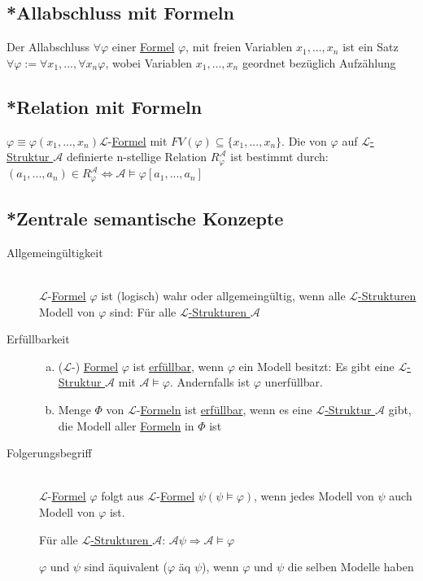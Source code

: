 \documentclass[12pt,a4paper]{article} %
\begin{document}
	\subsection{*Allabschluss mit Formeln}
	Der Allabschluss $\forall \varphi$ einer \hyperref[Formel]{Formel} $\varphi$, mit freien Variablen $x_1, ..., x_n$ ist ein Satz $\forall \varphi := \forall x_1, ..., \forall x_n \varphi$, wobei Variablen $x_1, ..., x_n$ geordnet bezüglich Aufzählung
	
	\subsection{*Relation mit Formeln}
	$\varphi \equiv \varphi(x_1, ..., x_n) \mathcal{L}$-\hyperref[Formel]{Formel} mit $FV(\varphi) \subseteq \{x_1, ..., x_n\}$. Die von $\varphi$ auf \hyperref[Struktur]{$\mathcal{L}$-Struktur $\mathcal{A}$} definierte n-stellige Relation $R_{\varphi}^{\mathcal{A}}$ ist bestimmt durch: $(a_1, ..., a_n) \in R_{\varphi}^{\mathcal{A}} \Leftrightarrow \mathcal{A} \hyperref[Erfullbar]{\vDash} \varphi[a_1, ..., a_n]$
	
	\subsection{*Zentrale semantische Konzepte}
	\begin{description}
		\item[Allgemeingültigkeit] \hfill \\ $\mathcal{L}$-\hyperref[Formel]{Formel} $\varphi$ ist (logisch) wahr oder allgemeingültig, wenn alle \hyperref[Struktur]{$\mathcal{L}$-Strukturen} Modell von $\varphi$ sind: Für alle \hyperref[Struktur]{$\mathcal{L}$-Strukturen $\mathcal{A}$}
		\item[Erfüllbarkeit] \hfill \begin{enumerate}[(a)]
			\item ($\mathcal{L}$-) \hyperref[Formel]{Formel} $\varphi$ ist \hyperref[Erfullbar]{erfüllbar}, wenn $\varphi$ ein Modell besitzt: Es gibt eine \hyperref[Struktur]{$\mathcal{L}$-Struktur $\mathcal{A}$} mit $\mathcal{A} \hyperref[Erfullbar]{\vDash} \varphi$. Andernfalls ist $\varphi$ unerfüllbar.
			\item Menge $\Phi$ von $\mathcal{L}$-\hyperref[Formel]{Formeln} ist \hyperref[Erfullbar]{erfüllbar}, wenn es eine \hyperref[Struktur]{$\mathcal{L}$-Struktur $\mathcal{A}$} gibt, die Modell aller \hyperref[Formel]{Formeln} in $\Phi$ ist
		\end{enumerate}
	\item[Folgerungsbegriff] \hfill \\ $\mathcal{L}$-\hyperref[Formel]{Formel} $\varphi$ folgt aus $\mathcal{L}$-\hyperref[Formel]{Formel} $\psi (\psi \hyperref[Erfullbar]{\vDash} \varphi)$, wenn jedes Modell von $\psi$ auch Modell von $\varphi$ ist.
	
	Für alle \hyperref[Struktur]{$\mathcal{L}$-Strukturen $\mathcal{A}$}: $\mathcal{A} \psi \Rightarrow \mathcal{A} \hyperref[Erfullbar]{\vDash} \varphi$
	
	$\varphi$ und $\psi$ sind äquivalent ($\varphi$ äq $\psi$), wenn $\varphi$ und $\psi$ die selben Modelle haben
	\end{description}
	
\end{document}
